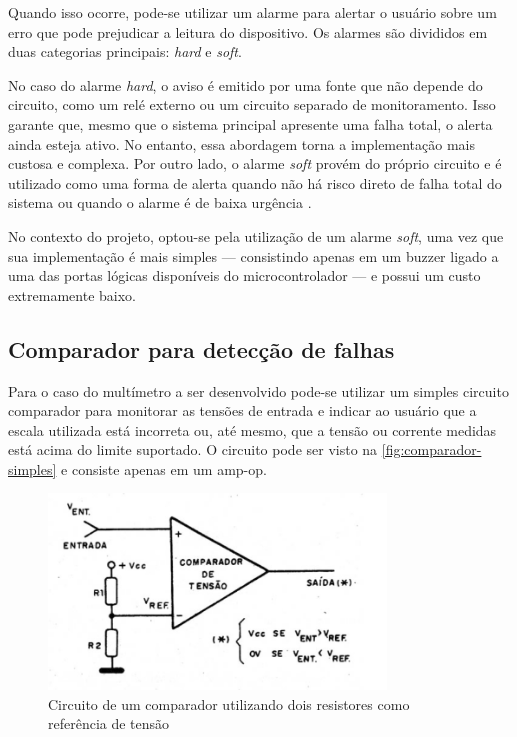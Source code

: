 Quando isso ocorre, pode-se utilizar um alarme para alertar o usuário sobre um erro que pode prejudicar a leitura do dispositivo. Os alarmes são divididos em duas categorias principais: \textit{hard} e \textit{soft}.

No caso do alarme \textit{hard}, o aviso é emitido por uma fonte que não depende do circuito, como um relé externo ou um circuito separado de monitoramento. Isso garante que, mesmo que o sistema principal apresente uma falha total, o alerta ainda esteja ativo. No entanto, essa abordagem torna a implementação mais custosa e complexa. Por outro lado, o alarme \textit{soft} provém do próprio circuito e é utilizado como uma forma de alerta quando não há risco direto de falha total do sistema ou quando o alarme é de baixa urgência \cite{base_alarms}.

No contexto do projeto, optou-se pela utilização de um alarme \textit{soft}, uma vez que sua implementação é mais simples — consistindo apenas em um buzzer ligado a uma das portas lógicas disponíveis do microcontrolador — e possui um custo extremamente baixo.

\subsection{Comparador para detecção de falhas} \label{subsec:compfalhas}

Para o caso do multímetro a ser desenvolvido pode-se utilizar um simples circuito comparador para monitorar as tensões de entrada e indicar ao usuário que a escala utilizada está incorreta ou, até mesmo, que a tensão ou corrente medidas está acima do limite suportado. O circuito pode ser visto na \autoref{fig:comparador-simples} e consiste apenas em um \gls{amp-op}.

\begin{figure}[htb!]
    \caption{Circuito de um comparador utilizando dois resistores como referência de tensão}
    \label{fig:comparador-simples}
    \includegraphics[width=0.8\textwidth]{figuras/ampop-comparador.png}
\end{figure}

